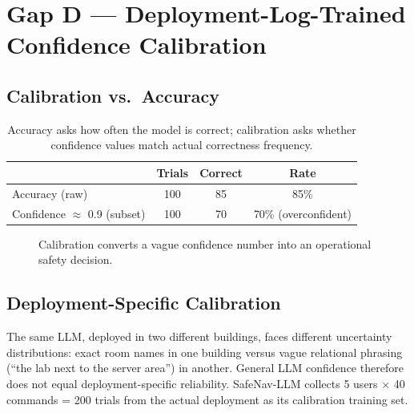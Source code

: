 \documentclass[11pt,a4paper]{article}
\begin{document}
\section{Gap D --- Deployment-Log-Trained Confidence Calibration}
\label{sec:gapd}

\subsection{Calibration vs.\ Accuracy}

\begin{table}[h]
\centering
\begin{tabular}{lccc}
\toprule
& \textbf{Trials} & \textbf{Correct} & \textbf{Rate} \\
\midrule
Accuracy (raw)          & 100 & 85 & 85\% \\
Confidence $\approx$ 0.9 (subset) & 100 & 70 & 70\% (overconfident) \\
\bottomrule
\end{tabular}
\caption{Accuracy asks how often the model is correct; calibration asks whether confidence values match actual correctness frequency.}
\end{table}

\begin{figure}[h]
\centering
{}
\caption{Calibration converts a vague confidence number into an operational safety decision.}
\end{figure}

\subsection{Deployment-Specific Calibration}

The same LLM, deployed in two different buildings, faces different
uncertainty distributions: exact room names in one building versus vague
relational phrasing (``the lab next to the server area'') in another.
General LLM confidence therefore does not equal deployment-specific
reliability. SafeNav-LLM collects 5 users $\times$ 40 commands = 200 trials
from the actual deployment as its calibration training set.
\end{document}
